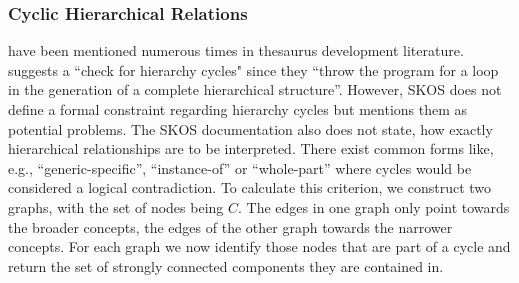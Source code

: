 \subsubsection{Cyclic Hierarchical Relations} have been mentioned numerous times in thesaurus development literature. \cite{Soergel2002} suggests a ``check for hierarchy cycles" since they ``throw the program for a loop in the generation of a complete hierarchical structure''. However, SKOS does not define a formal constraint regarding hierarchy cycles but \cite{SkosReference2008} mentions them as potential problems. The SKOS documentation also does not state, how exactly hierarchical relationships are to be interpreted. There exist common forms like, e.g., ``generic-specific'', ``instance-of'' or ``whole-part'' \cite{Hedden2010,Harpring2010,Aitchison2000} where cycles would be considered a logical contradiction. To calculate this criterion, we construct two graphs, with the set of nodes being $C$. The edges in one graph only point towards the broader concepts, the edges of the other graph towards the narrower concepts. For each graph we now identify those nodes that are part of a cycle and return the set of strongly connected components they are contained in.

 


